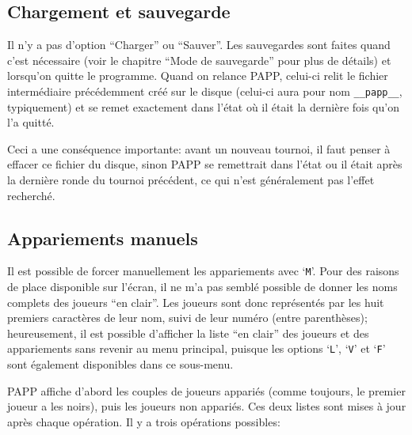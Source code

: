 \documentclass[10pt]{article}
\begin{document}
\subsection{Chargement et sauvegarde}

	Il n'y a pas d'option ``Charger'' ou ``Sauver''.  Les
sauvegardes sont faites quand c'est n\'ecessaire (voir le chapitre
``Mode de sauvegarde'' pour plus de d\'etails) et lorsqu'on quitte le
programme.  Quand on relance PAPP, celui-ci relit le fichier
interm\'ediaire pr\'ec\'edemment cr\'e\'e sur le disque (celui-ci
aura pour nom \verb|__papp__|, typiquement) et se remet exactement
dans l'\'etat o\`u il \'etait la derni\`ere fois qu'on l'a quitt\'e.

	Ceci a une cons\'equence importante: avant un nouveau tournoi,
il faut penser \`a effacer ce fichier du disque, sinon PAPP se remettrait
dans l'\'etat ou il \'etait apr\`es la derni\`ere ronde du tournoi
pr\'ec\'edent, ce qui n'est g\'en\'eralement pas l'effet recherch\'e.

\subsection{Appariements manuels}

Il est possible de forcer manuellement les appariements avec 
`\verb|M|'.  Pour des raisons de place disponible sur l'\'ecran, il ne 
m'a pas sembl\'e possible de donner les noms complets des joueurs ``en 
clair''.  Les joueurs sont donc repr\'esent\'es par les huit premiers 
caract\`eres de leur nom, suivi de leur num\'ero (entre 
parenth\`eses); heureusement, il est possible d'afficher la liste ``en 
clair'' des joueurs et des appariements sans revenir au menu 
principal, puisque les options `\verb|L|', `\verb|V|' et `\verb|F|' 
sont \'egalement disponibles dans ce sous-menu.

	PAPP affiche d'abord les couples de joueurs appari\'es (comme
toujours, le premier joueur a les noirs), puis les joueurs non
appari\'es.  Ces deux listes sont mises \`a jour apr\`es chaque
op\'eration.  Il y a trois op\'erations possibles:
\end{document}
